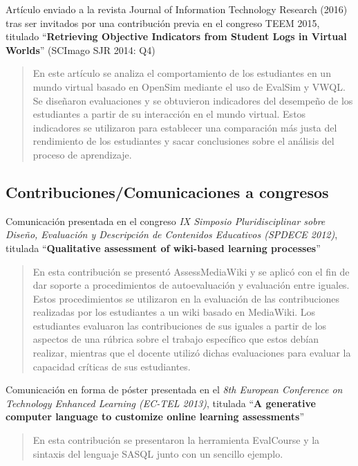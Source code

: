 \noindent
Artículo enviado a la revista Journal of Information Technology Research (2016) tras ser invitados por una contribución previa en el congreso TEEM 2015, titulado ``\textbf{Retrieving Objective Indicators from Student Logs in Virtual Worlds}'' (SCImago SJR 2014: Q4)

\begin{quote}En este artículo se analiza el comportamiento de los estudiantes en un mundo virtual basado en OpenSim mediante el uso de EvalSim y VWQL. Se diseñaron evaluaciones y se obtuvieron indicadores del desempeño de los estudiantes a partir de su interacción en el mundo virtual. Estos indicadores se utilizaron para establecer una comparación más justa del rendimiento de los estudiantes y sacar conclusiones sobre el análisis del proceso de aprendizaje.\end{quote}


	\subsection*{Contribuciones/Comunicaciones a congresos}

Comunicación presentada en el congreso \emph{IX Simposio Pluridisciplinar sobre Diseño, Evaluación y Descripción de Contenidos Educativos (SPDECE 2012)}, titulada ``\textbf{Qualitative assessment of wiki-based learning processes}''~\cite{Balderas:2012}

\begin{quote}	En esta contribución se presentó AssessMediaWiki y se aplicó con el fin de dar soporte a procedimientos de autoevaluación y evaluación entre iguales. Estos procedimientos se utilizaron en la evaluación de las contribuciones realizadas por los estudiantes a un wiki basado en MediaWiki. Los estudiantes evaluaron las contribuciones de sus iguales a partir de los aspectos de una rúbrica sobre el trabajo específico que estos debían realizar, mientras que el docente utilizó dichas evaluaciones para evaluar la capacidad críticas de sus estudiantes.\end{quote}

\noindent
Comunicación en forma de póster presentada en el \emph{8th European Conference on Technology Enhanced Learning (EC-TEL 2013)}, titulada ``\textbf{A generative computer language to customize online learning assessments}''~\cite{Balderas:2013}

\begin{quote}En esta contribución se presentaron la herramienta EvalCourse y la sintaxis del lenguaje SASQL junto con un sencillo ejemplo.\end{quote}

